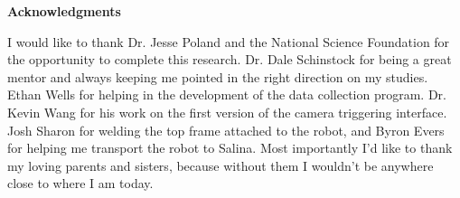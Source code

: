 
\vspace*{0.9cm}
\begin{center}
{\bf \Huge Acknowledgments}
\end{center}

\setlength{\baselineskip}{0.8cm}



I would like to thank Dr. Jesse Poland and the National Science Foundation for the opportunity to complete this research.  Dr. Dale Schinstock for being a great mentor and always keeping me pointed in the right direction on my studies.  Ethan Wells for helping in the development of the data collection program.  Dr. Kevin Wang for his work on the first version of the camera triggering interface.  Josh Sharon for welding the top frame attached to the robot, and Byron Evers for helping me transport the robot to Salina.   Most importantly I'd like to thank my loving parents and sisters, because without them I wouldn't be anywhere close to where I am today.
